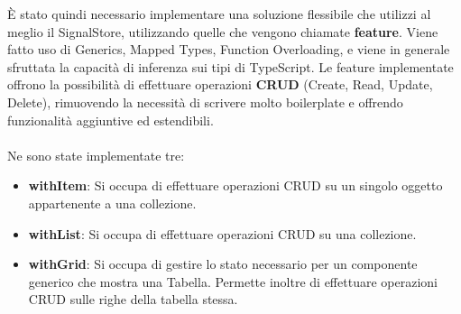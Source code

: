 \`E stato quindi necessario implementare una soluzione flessibile che utilizzi al meglio il SignalStore, utilizzando quelle che vengono chiamate \textbf{feature}.
Viene fatto uso di Generics, Mapped Types, Function Overloading, e viene in generale sfruttata la capacit\`a di inferenza sui tipi di TypeScript.
Le feature implementate offrono la possibilit\`a di effettuare operazioni \textbf{CRUD} (Create, Read, Update, Delete), rimuovendo la necessit\`a di scrivere molto boilerplate e offrendo
funzionalit\`a aggiuntive ed estendibili.
\\\\
Ne sono state implementate tre:
\begin{itemize}
  \item \textbf{withItem}: Si occupa di effettuare operazioni CRUD su un singolo oggetto appartenente a una collezione.
  \item \textbf{withList}: Si occupa di effettuare operazioni CRUD su una collezione.
  \item \textbf{withGrid}: Si occupa di gestire lo stato necessario per un componente generico che mostra una Tabella. Permette inoltre di effettuare operazioni CRUD sulle righe
    della tabella stessa.
\end{itemize}

